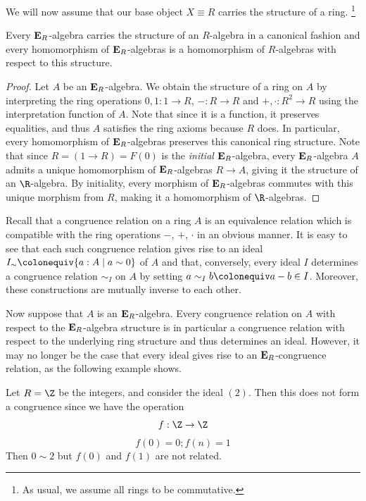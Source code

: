 {We will now assume that our base object \(X\equiv R\) carries the structure of a ring.%
\footnote{As usual, we assume all rings to be commutative.}
\begin{lemma}
  Every \(\mathbf{E}_R\)-algebra carries the structure of an \(R\)-algebra in a canonical fashion and every homomorphism of \(\mathbf{E}_R\)-algebras is a homomorphism of \(R\)-algebras with respect to this structure.
\end{lemma}
\begin{proof}
  Let \(A\) be an \(\mathbf{E}_R\)-algebra.
  We obtain the structure of a ring on \(A\) by interpreting the ring operations \(0,1:1\to R\), \(- : R\to R\) and \(+,\cdot : R^2\to R\) using the interpretation function of \(A\).
  Note that since it is a function, it preserves equalities, and thus \(A\) satisfies the ring axioms because \(R\) does.
  In particular, every homomorphism of \(\mathbf{E}_R\)-algebras preserves this canonical ring structure.
  Note that since \(R = (1\to R)= F(0)\) is the \emph{initial} \(\mathbf{E}_R\)-algebra, every \(\mathbf{E}_R\)-algebra \(A\) admits a unique homomorphism of \(\mathbf{E}_R\)-algebras \(R\to A\), giving it the structure of an \(\R\)-algebra.
  By initiality, every morphism of \(\mathbf{E}_R\)-algebras commutes with this unique morphism from \(R\), making it a homomorphism of \(\R\)-algebras.
\end{proof}

Recall that a congruence relation on a ring \(A\) is an equivalence relation which is compatible with the ring operations \(-\), \(+\), \(\cdot\) in an obvious manner.
It is easy to see that each such congruence relation gives rise to an ideal \(I_\sim\colonequiv \{a:A\mid a\sim 0\}\) of \(A\) and that, conversely, every ideal \(I\) determines a congruence relation \(\sim_I\) on \(A\) by setting \(a\sim_I b\colonequiv a-b\in I\).
Moreover, these constructions are mutually inverse to each other.

Now suppose that \(A\) is an \(\mathbf{E}_R\)-algebra.
Every congruence relation on \(A\) with respect to the \(\mathbf{E}_R\)-algebra structure is in particular a congruence relation with respect to the underlying ring structure and thus determines an ideal.
However, it may no longer be the case that every ideal gives rise to an \(\mathbf{E}_R\)-congruence relation, as the following example shows.

\begin{example}
  Let $R = \Z$ be the integers, and consider the ideal $(2)$.
  Then this does not form a congruence since we have the operation 
  \[ f : \Z \to \Z \]
  \[ f(0) = 0 ; f(n) = 1 \]
  Then $0 \sim 2$ but $f(0)$ and $f(1)$ are not related.
\end{example}

}
